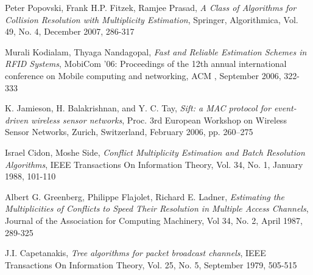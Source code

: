 \begin{thebibliography}{99}
 
  Peter Popovski, Frank H.P. Fitzek, Ramjee Prasad, \emph{ A Class of Algorithms for Collision Resolution with Multiplicity Estimation}, Springer, Algorithmica, Vol. 49, No. 4, December 2007, 286-317
  
Murali Kodialam, Thyaga Nandagopal, \emph{Fast and Reliable Estimation Schemes in RFID Systems}, MobiCom '06: Proceedings of the 12th annual international conference on Mobile computing and networking, ACM , September 2006, 322-333 
 
K. Jamieson, H. Balakrishnan, and Y. C. Tay, \emph{Sift: a MAC protocol for event-driven wireless sensor networks},  Proc. 3rd European Workshop on Wireless Sensor Networks, Zurich, Switzerland, February 2006, pp. 260–275 

 Israel Cidon, Moshe Side, \emph{Conflict Multiplicity Estimation and Batch Resolution Algorithms}, IEEE Transactions On Information Theory, Vol. 34, No. 1, January 1988, 101-110
 
  Albert G. Greenberg, Philippe Flajolet,  Richard E. Ladner,
  \emph{Estimating the Multiplicities of Conflicts to Speed Their Resolution in Multiple Access Channels},
  Journal of the Association for Computing Machinery,
  Vol 34, No. 2, April 1987, 289-325
 
  J.I. Capetanakis, \emph{ Tree algorithms for packet broadcast channels}, IEEE Transactions On Information Theory, Vol. 25, No. 5, September 1979, 505-515
 \end{thebibliography}
 
